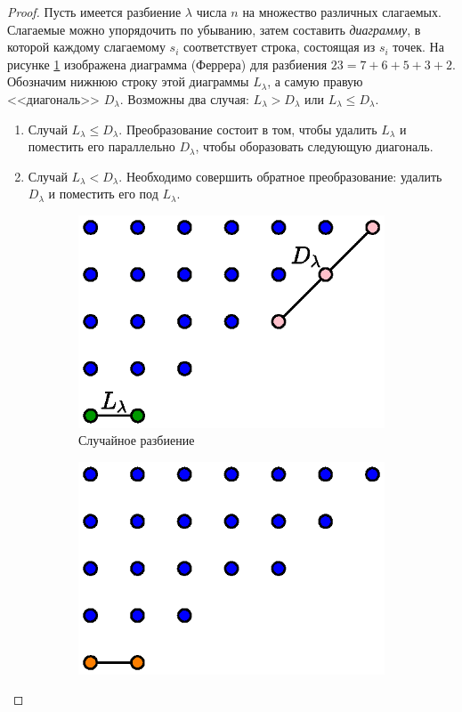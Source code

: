 \documentclass{article}
\theoremstyle{definition}
\begin{document}
\begin{proof}
	Пусть имеется разбиение \( \lambda \) числа \( n \) на множество различных 
	слагаемых. 
	Слагаемые можно упорядочить по убыванию, затем составить 
	\textit{диаграмму}, в которой каждому слагаемому \( s_i \) соответствует 
	строка, состоящая из \( s_i \) точек. На рисунке \ref{fig:ferrer_1} 
	изображена диаграмма (Феррера) для разбиения \( 23 = 7+6+5+3+2 \). 
	Обозначим нижнюю строку этой диаграммы \( L_{\lambda} \), а самую правую 
	<<диагональ>> \( D_{\lambda} \). Возможны два случая: \( L_{\lambda} > 
	D_{\lambda} \) или \( L_{\lambda} \leq D_{\lambda} \).
	\begin{enumerate}
	\item Случай \( L_{\lambda} \leq D_{\lambda} \). Преобразование состоит в 
	том, чтобы удалить \( L_{\lambda} \) и поместить его параллельно \( 
	D_{\lambda} \), чтобы оборазовать следующую диагональ.
	\item Случай \( L_{\lambda} < D_{\lambda} \). Необходимо совершить обратное 
	преобразование: удалить \( D_{\lambda} \) и поместить его под \( 
	L_{\lambda} \).
	\end{enumerate}
\begin{figure}[h]
\centering
\begin{subfigure}{.33\textwidth}
	\centering
	\includegraphics[width=.8\textwidth]{ferrer_1}
	\caption{Случайное разбиение}
	\label{fig:ferrer_1}	
\end{subfigure}%
\begin{subfigure}{.33\textwidth}
	\centering
	\includegraphics[width=.7\textwidth]{ferrer_2}

\end{subfigure}
\end{figure}
\end{proof}
\end{document}
